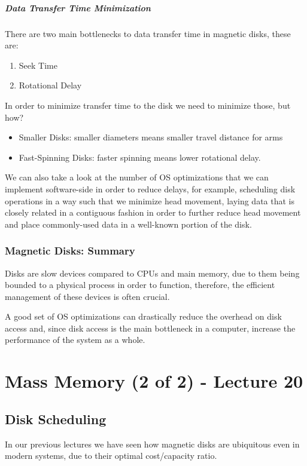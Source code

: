 \documentclass[openright, twoside]{report}
\theoremstyle{definition}
\theoremstyle{example}
\begin{document}
\paragraph{Data Transfer Time Minimization}
There are two main bottlenecks to data transfer time in magnetic disks, these are:

\begin{enumerate}
	\item Seek Time
	\item Rotational Delay
\end{enumerate}

In order to minimize transfer time to the disk we need to minimize those, but how?

\begin{itemize}
	\item Smaller Disks: smaller diameters means smaller travel distance for arms
	\item Fast-Spinning Disks: faster spinning means lower rotational delay.
\end{itemize}

We can also take a look at the number of OS optimizations that we can implement
software-side in order to reduce delays, for example, scheduling disk operations 
in a way such that we minimize head movement, laying data that is closely related in 
a contiguous fashion in order to further reduce head movement and place commonly-used 
data in a well-known portion of the disk.

\subsection{Magnetic Disks: Summary}
Disks are slow devices compared to CPUs and main memory, due to them being
bounded to a physical process in order to function, therefore, the efficient 
management of these devices is often crucial.

A good set of OS optimizations can drastically reduce the overhead on disk access
and, since disk access is the main bottleneck in a computer, increase the performance
of the system as a whole.

\chapter{Mass Memory (2 of 2) - Lecture 20}
\section{Disk Scheduling}
In our previous lectures we have seen how magnetic disks are ubiquitous 
even in modern systems, due to their optimal cost/capacity ratio.
\end{document}
